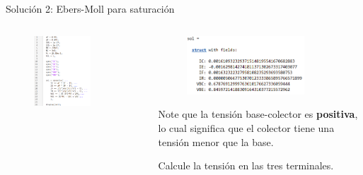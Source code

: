 \documentclass[t,aspectratio=169]{beamer}
\begin{document}
\begin{frame}{Solución 2: Ebers-Moll para saturación}

\begin{columns}

\begin{column}{0.5\textwidth}

\begin{figure}
    \centering
    \includegraphics[width=0.7\textwidth]{figuras/solution_1.png}
\end{figure}

\end{column}

\begin{column}{0.5\textwidth}

\begin{figure}
    \centering
    \includegraphics[width=0.8\textwidth]{figuras/solution_2.png}
\end{figure}

Note que la tensión base-colector es \textbf{positiva}, lo cual significa que el colector tiene una tensión menor que la base.

\vspace{5mm}Calcule la tensión en las tres terminales.

\end{column}

\end{columns}

\end{frame}
\end{document}
